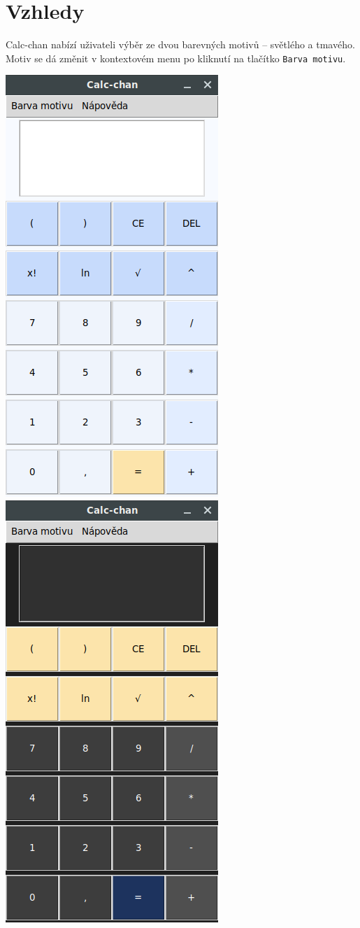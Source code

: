 \documentclass[a4paper, 11pt]{article}
\begin{document}
\section{Vzhledy}
Calc-chan nabízí uživateli výběr ze dvou barevných motivů -- světlého a tmavého. Motiv se dá změnit v kontextovém menu po kliknutí na tlačítko \texttt{Barva motivu}.\\
\begin{center}
\includegraphics[scale=0.5]{screenshot.png}
\hspace{50pt}
\includegraphics[scale=0.5]{screenshot2.png}
\end{center}
\end{document}
